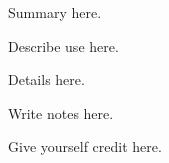 


\ModuleRefSummary
Summary here.

\ModuleRefUse
Describe use here.

\ModuleRefDetails
Details here.

\ModuleRefNotes
Write notes here.

\ModuleRefCredits
Give yourself credit here.

